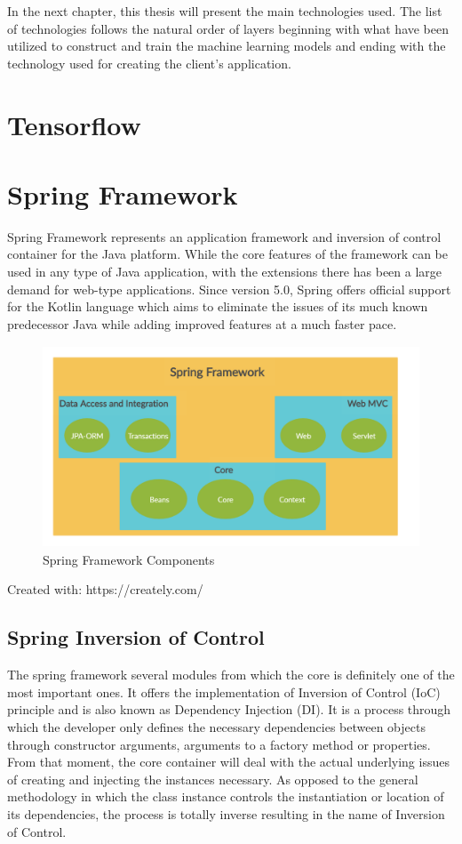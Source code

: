In the next chapter, this thesis will present the main technologies used. The list of technologies follows the natural order of layers beginning with what have been utilized to construct and train the machine learning models and ending with the technology used for creating the client's application.

\section{Tensorflow}


\section{Spring Framework}

Spring Framework represents an application framework and inversion of control container for the Java platform. While the core features of the framework can be used in any type of Java application, with the extensions there has been a large demand for web-type applications. Since version 5.0, Spring offers official support for the Kotlin language which aims to eliminate the issues of its much known predecessor Java while adding improved features at a much faster pace.

\begin{figure}[H]
\centering
\includegraphics[height=6cm]{images/SpringFramework.png} 
\caption{Spring Framework Components}
\label{fig:springframework}
\end{figure}
\begin{flushright}
Created with: https://creately.com/
\end{flushright}

\subsection*{Spring Inversion of Control}

The spring framework several modules from which the core is definitely one of the most important ones. It offers the implementation of Inversion of Control (IoC) principle and is also known as Dependency Injection (DI). It is a process through which the developer only defines the necessary dependencies between objects through constructor arguments, arguments to a factory method or properties. From that moment, the core container will deal with the actual underlying issues of creating and injecting the instances necessary. As opposed to the general methodology in which the class instance controls the instantiation or location of its dependencies, the process is totally inverse resulting in the name of Inversion of Control.

